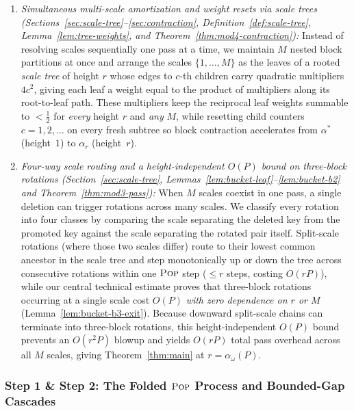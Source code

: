 \documentclass[11pt]{article}
\theoremstyle{definition}
\theoremstyle{remark}
\newcommand{\POP}{\textnormal{\scshape Pop}}
\begin{document}
\begin{enumerate}[label=(\arabic*), leftmargin=2em, itemsep=2pt]
  \item \emph{Simultaneous multi-scale amortization and weight resets via scale trees (Sections~\ref{sec:scale-tree}--\ref{sec:contraction}, Definition~\ref{def:scale-tree}, Lemma~\ref{lem:tree-weights}, and Theorem~\ref{thm:mod4-contraction}):} Instead of resolving scales sequentially one pass at a time, we maintain $M$ nested block partitions at once and arrange the scales $\{1, \dots, M\}$ as the leaves of a rooted \emph{scale tree} of height $r$ whose edges to $c$-th children carry quadratic multipliers $4 c^2$, giving each leaf a weight equal to the product of multipliers along its root-to-leaf path. These multipliers keep the reciprocal leaf weights summable to $< \frac{1}{2}$ for \emph{every} height $r$ and \emph{any} $M$, while resetting child counters $c = 1, 2, \dots$ on every fresh subtree so block contraction accelerates from $\alpha^*$ (height~$1$) to $\alpha_r$ (height~$r$).
  \item \emph{Four-way scale routing and a height-independent $O(P)$ bound on three-block rotations (Section~\ref{sec:scale-tree}, Lemmas~\ref{lem:bucket-leaf}--\ref{lem:bucket-b2} and Theorem~\ref{thm:mod3-pass}):} When $M$ scales coexist in one pass, a single deletion can trigger rotations across many scales. We classify every rotation into four classes by comparing the scale separating the deleted key from the promoted key against the scale separating the rotated pair itself. Split-scale rotations (where those two scales differ) route to their lowest common ancestor in the scale tree and step monotonically up or down the tree across consecutive rotations within one $\POP$ step ($\le r$ steps, costing $O(r P)$), while our central technical estimate proves that three-block rotations occurring at a single scale cost $O(P)$ \emph{with zero dependence on $r$ or $M$} (Lemma~\ref{lem:bucket-b3-exit}). Because downward split-scale chains can terminate into three-block rotations, this height-independent $O(P)$ bound prevents an $O(r^2 P)$ blowup and yields $O(r P)$ total pass overhead across all $M$ scales, giving Theorem~\ref{thm:main} at $r = \alpha_\omega(P)$.
\end{enumerate}

\subsubsection{Step 1 \& Step 2: The Folded \texorpdfstring{$\POP$}{Pop} Process and Bounded-Gap Cascades}
\label{subsubsec:step12}
\end{document}
